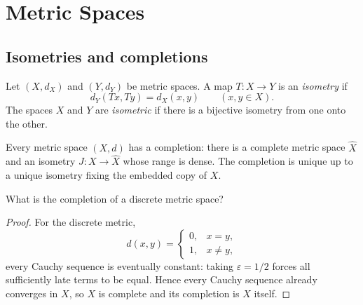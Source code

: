 \chapter{Metric Spaces}

\section{Isometries and completions}

\begin{notedefinition}
Let $(X,d_X)$ and $(Y,d_Y)$ be metric spaces.  A map $T\colon X\to Y$ is an
\emph{isometry} if
\[
  d_Y(Tx,Ty)=d_X(x,y)
  \qquad(x,y\in X).
\]
The spaces $X$ and $Y$ are \emph{isometric} if there is a bijective isometry
from one onto the other.
\end{notedefinition}

\begin{notetheorem}[Completion]
Every metric space $(X,d)$ has a completion: there is a complete metric space
$\widehat X$ and an isometry $J\colon X\to\widehat X$ whose range is dense.
The completion is unique up to a unique isometry fixing the embedded copy of
$X$.
\end{notetheorem}

\begin{noteexercise}
What is the completion of a discrete metric space?
\end{noteexercise}

\begin{proof}
For the discrete metric,
\[
  d(x,y)=
  \begin{cases}
    0,&x=y,\\
    1,&x\ne y,
  \end{cases}
\]
every Cauchy sequence is eventually constant: taking $\varepsilon=1/2$
forces all sufficiently late terms to be equal.  Hence every Cauchy sequence
already converges in $X$, so $X$ is complete and its completion is $X$ itself.
\end{proof}
